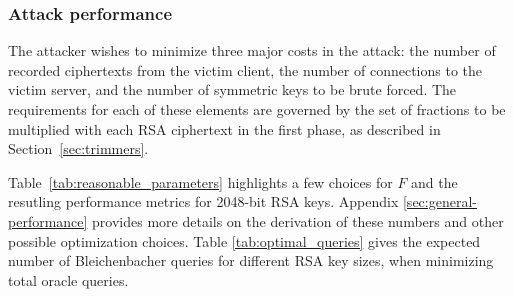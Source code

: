 \newcommand{\GPUTable}{
\begin{table*}[t]
 \centering
 \begin{tabular}{llrrrr}
        \toprule
        \textbf{Platform} & \textbf{Hardware} & \textbf{Cost} & \textbf{Full attack}  & \textbf{Cost to perform attack in 1 day} \\
        \midrule
        Na\"{\i}ve CPU & 4 Intel Xeon E7-4820 & $\$21,400$ & $114$ days  & \$$2,440,000$\\
        Na\"{\i}ve GPU & ZOTAC GeForce GTX TITAN & $\$2,400$  & $189$ days & \$$450,000$ \\
        Na\"{\i}ve FPGA & 64 Spartan-6 LX150 & $\$60,000$ & $51.5$ days  & \$$3,090,000$  \\
        \cmidrule{1-5}
        Optimized Hashcat & NVIDIA GTX / AMD R9 & \$18,040 & $0.75$ days & \$13,500 \\
        Optimized EC2 & NVIDIA & \$440 & $0.33$ days & \$147 \\
        \bottomrule
  \end{tabular}	
\caption{\textbf{Time and cost efficiency of our attack on different hardware platforms.} The brute force attacks against symmetric export keys are the most expensive part of our attack.  We compared the performance of a na\"{\i}ve implementation of our attack on different platforms, and decided that a GPU implementation held the most promise.  We then heavily optimized our GPU implementation, obtaining several orders of magnitude in speedup.}
\label{perf_comparison}
\end{table*}
}

\subsubsection{Attack performance}
\label{sec:bb-performance}
The attacker wishes to minimize three major costs in the attack: the number of recorded ciphertexts from the victim client, the number of connections to the victim server, and the number of symmetric keys to be brute forced.
The requirements for each of these elements are governed by the set of fractions to be multiplied with each RSA ciphertext in the first phase, as described in Section~\ref{sec:trimmers}.

Table~\ref{tab:reasonable_parameters} highlights a few choices for $F$ and the resutling performance metrics for 2048-bit RSA keys.
Appendix \ref{sec:general-performance} provides more details on the derivation of these numbers and other possible optimization choices.
Table \ref{tab:optimal_queries} gives the expected number of Bleichenbacher queries for different RSA key sizes, when minimizing total oracle queries.







